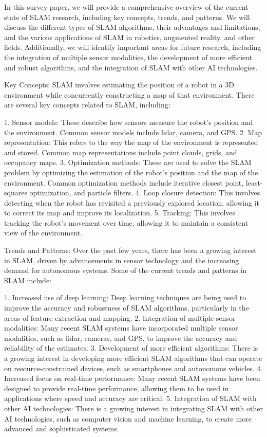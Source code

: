 \documentclass[conference]{IEEEtran}
\begin{document}
In this survey paper, we will provide a comprehensive overview of the current state of SLAM research, including key concepts, trends, and patterns. We will discuss the different types of SLAM algorithms, their advantages and limitations, and the various applications of SLAM in robotics, augmented reality, and other fields. Additionally, we will identify important areas for future research, including the integration of multiple sensor modalities, the development of more efficient and robust algorithms, and the integration of SLAM with other AI technologies.

Key Concepts:
SLAM involves estimating the position of a robot in a 3D environment while concurrently constructing a map of that environment. There are several key concepts related to SLAM, including:

1. Sensor models: These describe how sensors measure the robot's position and the environment. Common sensor models include lidar, camera, and GPS.
2. Map representation: This refers to the way the map of the environment is represented and stored. Common map representations include point clouds, grids, and occupancy maps.
3. Optimization methods: These are used to solve the SLAM problem by optimizing the estimation of the robot's position and the map of the environment. Common optimization methods include iterative closest point, least-squares optimization, and particle filters.
4. Loop closure detection: This involves detecting when the robot has revisited a previously explored location, allowing it to correct its map and improve its localization.
5. Tracking: This involves tracking the robot's movement over time, allowing it to maintain a consistent view of the environment.

Trends and Patterns:
Over the past few years, there has been a growing interest in SLAM, driven by advancements in sensor technology and the increasing demand for autonomous systems. Some of the current trends and patterns in SLAM include:

1. Increased use of deep learning: Deep learning techniques are being used to improve the accuracy and robustness of SLAM algorithms, particularly in the areas of feature extraction and mapping.
2. Integration of multiple sensor modalities: Many recent SLAM systems have incorporated multiple sensor modalities, such as lidar, cameras, and GPS, to improve the accuracy and reliability of the estimates.
3. Development of more efficient algorithms: There is a growing interest in developing more efficient SLAM algorithms that can operate on resource-constrained devices, such as smartphones and autonomous vehicles.
4. Increased focus on real-time performance: Many recent SLAM systems have been designed to provide real-time performance, allowing them to be used in applications where speed and accuracy are critical.
5. Integration of SLAM with other AI technologies: There is a growing interest in integrating SLAM with other AI technologies, such as computer vision and machine learning, to create more advanced and sophisticated systems.
\end{document}
